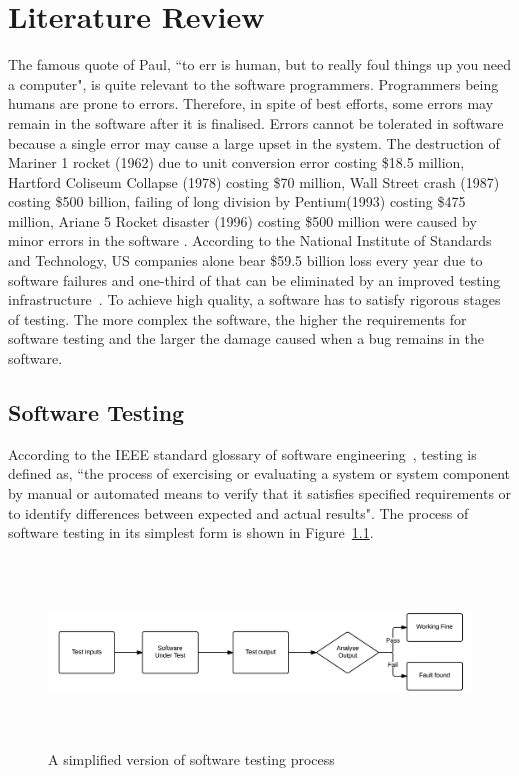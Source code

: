 
\chapter{Literature Review}
\label{chap:softwareTesting}
The famous quote of Paul, ``to err is human, but to really foul things up you need a computer", is quite relevant to the software programmers. Programmers being humans are prone to errors. Therefore, in spite of best efforts, some errors may remain in the software after it is finalised.  Errors cannot be tolerated in software because a single error may cause a large upset in the system. The destruction of Mariner 1 rocket (1962) due to unit conversion error costing \$18.5 million, Hartford Coliseum Collapse (1978) costing \$70 million, Wall Street crash (1987) costing \$500 billion, failing of long division by Pentium\texttrademark (1993) costing \$475 million, Ariane 5 Rocket disaster (1996) costing \$500 million were caused by minor errors in the software \cite{toweysoftware}. According to the National Institute of Standards and Technology, US companies alone bear \$59.5 billion loss every year due to software failures and one-third of that can be eliminated by an improved testing infrastructure~\cite{tassey2002economic}. To achieve high quality, a software has to satisfy rigorous stages of testing. The more complex the software, the higher the requirements for software testing and the larger the damage caused when a bug remains in the software.

\section{Software Testing}
According to the IEEE standard glossary of software engineering~\cite{american1984}, testing is defined as, ``the process of exercising or evaluating a system or system component by manual or automated means to verify that it satisfies specified requirements or to identify differences between expected and actual results". The process of software testing in its simplest form is shown in Figure~\ref{fig:softwareTesting_2}. 

\begin{figure}[h]
	\centering
	\centerline{\includegraphics[width=16cm, height=5cm]{chapter2/softwareTesting.png}}
	\caption{A simplified version of software testing process}
	\label{fig:softwareTesting_2}
\end{figure}

